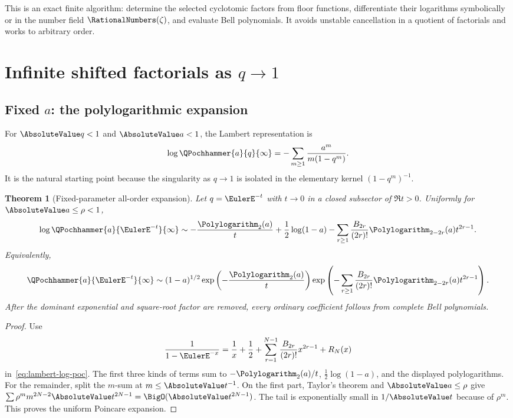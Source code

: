 \documentclass[11pt,oneside]{article}
\newtheorem{theorem}{Theorem}[section]
\theoremstyle{definition}
\theoremstyle{remark}
\let\reporttopsection\section
\let\reportsubsection\subsection
\let\chapter\reporttopsection
\let\section\reportsubsection
\begin{document}
This is an exact finite algorithm: determine the selected cyclotomic factors
from floor functions, differentiate their logarithms symbolically or in the
number field $\RationalNumbers(\zeta)$, and evaluate Bell polynomials.  It avoids unstable
cancellation in a quotient of factorials and works to arbitrary order.

\chapter{Infinite shifted factorials as \texorpdfstring{$q\to1$}{q tends to 1}}\label{chap:infinite-qone}

\section{Fixed \texorpdfstring{$a$}{a}: the polylogarithmic expansion}

For $\AbsoluteValue q<1$ and $\AbsoluteValue a<1$, the Lambert representation is
\begin{equation}\label{eq:lambert-log-poc}
 \log\QPochhammer{a}{q}{\infty}
 =-\sum_{m\ge1}\frac{a^m}{m(1-q^m)}.
\end{equation}
It is the natural starting point because the singularity as $q\to1$ is
isolated in the elementary kernel $(1-q^m)^{-1}$.

\begin{theorem}[Fixed-parameter all-order expansion]\label{thm:infinite-fixed-a}
Let $q=\EulerE^{-t}$ with $t\to0$ in a closed subsector of $\Re t>0$.  Uniformly for
$\AbsoluteValue a\le\rho<1$,
\begin{equation}\label{eq:infinite-fixed-a}
 \log\QPochhammer{a}{\EulerE^{-t}}{\infty}
 \sim-\frac{\Polylogarithm_2(a)}{t}+\frac12\log(1-a)
 -\sum_{r\ge1}\frac{B_{2r}}{(2r)!}
   \Polylogarithm_{2-2r}(a)t^{2r-1}.
\end{equation}
Equivalently,
\begin{equation}\label{eq:infinite-fixed-a-product}
 \QPochhammer{a}{\EulerE^{-t}}{\infty}
 \sim (1-a)^{1/2}\exp\left(-\frac{\Polylogarithm_2(a)}t
 \right)
 \exp\left(-\sum_{r\ge1}\frac{B_{2r}}{(2r)!}
 \Polylogarithm_{2-2r}(a)t^{2r-1}\right).
\end{equation}
After the dominant exponential and square-root factor are removed, every
ordinary coefficient follows from complete Bell polynomials.
\end{theorem}

\begin{proof}
Use
\[
 \frac1{1-\EulerE^{-x}}
 =\frac1x+\frac12+
 \sum_{r=1}^{N-1}\frac{B_{2r}}{(2r)!}x^{2r-1}+R_N(x)
\]
in~\eqref{eq:lambert-log-poc}.  The first three kinds of terms sum to
$-\Polylogarithm_2(a)/t$, $\tfrac12\log(1-a)$, and the displayed polylogarithms.
For the remainder, split the $m$-sum at $m\le\AbsoluteValue t^{-1}$.  On the first part,
Taylor's theorem and $\AbsoluteValue a\le\rho$ give
\(
\sum \rho^m m^{2N-2}\AbsoluteValue t^{2N-1}=\BigO(\AbsoluteValue t^{2N-1})
\).
The tail is exponentially small in $1/\AbsoluteValue t$ because of $\rho^m$.  This proves
the uniform Poincare expansion.
\end{proof}
\end{document}
